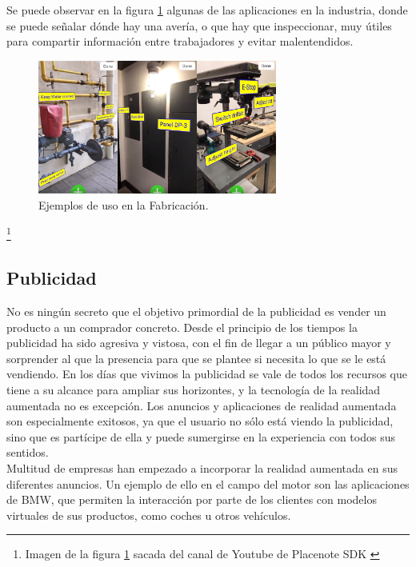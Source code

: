 Se puede observar en la figura \ref{fig:placenote} algunas de las aplicaciones en la industria, donde se puede señalar dónde hay una avería, o que hay que inspeccionar, muy útiles para compartir información entre trabajadores y evitar malentendidos.

\begin{figure}[H]
     \centering
     \includegraphics[width=0.7\textwidth]{Images/Placenote.jpg}
     \caption{Ejemplos de uso en la Fabricación.}
     \label{fig:placenote}
 \end{figure}
 {\let\thefootnote\relax\footnote{{Imagen de la figura \ref{fig:placenote} sacada del canal de Youtube de Placenote SDK \cite{PlacenoteYT}}}}

\subsection{Publicidad}
No es ningún secreto que el objetivo primordial de la publicidad es vender un producto a un comprador concreto. Desde el principio de los tiempos la publicidad ha sido agresiva y vistosa, con el fin de llegar a un público mayor y sorprender al que la presencia para que se plantee si necesita lo que se le está vendiendo. En los días que vivimos la publicidad se vale de todos los recursos que tiene a su alcance para ampliar sus horizontes, y la tecnología de la realidad aumentada no es excepción. Los anuncios y aplicaciones de realidad aumentada son especialmente exitosos, ya que el usuario no sólo está viendo la publicidad, sino que es partícipe de ella y puede sumergirse en la experiencia con todos sus sentidos.\\

Multitud de empresas han empezado a incorporar la realidad aumentada en sus diferentes anuncios. Un ejemplo de ello en el campo del motor son las aplicaciones de BMW, que permiten la interacción por parte de los clientes con modelos virtuales de sus productos, como coches u otros vehículos.\cite{Neosentec_Pub}\\

